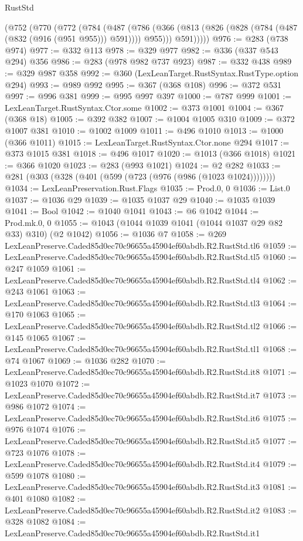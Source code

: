 \begin{lexlean}{RustStd}
\begin{coremodule}
    (@752
      (@770
        (@772
          (@784
            (@487
              (@786 (@366 (@813 (@826 (@828 (@784 (@487 (@832 (@916 (@951 @955))) @591)))) @955)))
              @591)))))
@976 := @283 (@738 @974)
@977 := @332 @113
@978 := @329 @977
@982 := @336 (@337 @543 @294) @356
@986 := @283 (@978 @982 @737 @923)
@987 := @332 @438
@989 := @329 @987 @358
@992 := @360 (LexLeanTarget.RustSyntax.RustType.option @294)
@993 := @989 @992
@995 := @367 (@368 @108)
@996 := @372 @531
@997 := @996 @381
@999 := @995 @997 @397
@1000 := @787 @999
@1001 := LexLeanTarget.RustSyntax.Ctor.some
@1002 := @373 @1001
@1004 := @367 (@368 @18)
@1005 := @392 @382
@1007 := @1004 @1005 @310
@1009 := @372 @1007 @381
@1010 := @1002 @1009
@1011 := @496 @1010
@1013 := @1000 (@366 @1011)
@1015 := LexLeanTarget.RustSyntax.Ctor.none @294
@1017 := @373 @1015 @381
@1018 := @496 @1017
@1020 := @1013 (@366 @1018)
@1021 := @366 @1020
@1023 := @283 (@993 @1021)
@1024 := @2 @282
@1033 := @281 (@303 (@328 (@401 (@599 (@723 (@976 (@986 (@1023 @1024))))))))
@1034 := LexLeanPreservation.Rust.Flags
@1035 := Prod.{0, 0}
@1036 := List.{0}
@1037 := @1036 @29
@1039 := @1035 @1037 @29
@1040 := @1035 @1039
@1041 := Bool
@1042 := @1040 @1041
@1043 := @6 @1042
@1044 := Prod.mk.{0, 0}
@1055 := @1043 (@1044 @1039 @1041 (@1044 @1037 @29 @82 @33) @310) (@2 @1042)
@1056 := @1036 @7
@1058 := @269 LexLeanPreserve.Caded85d0ec70c96655a45904ef60abdb.R2.RustStd.tl6
@1059 := LexLeanPreserve.Caded85d0ec70c96655a45904ef60abdb.R2.RustStd.tl5
@1060 := @247 @1059
@1061 := LexLeanPreserve.Caded85d0ec70c96655a45904ef60abdb.R2.RustStd.tl4
@1062 := @243 @1061
@1063 := LexLeanPreserve.Caded85d0ec70c96655a45904ef60abdb.R2.RustStd.tl3
@1064 := @170 @1063
@1065 := LexLeanPreserve.Caded85d0ec70c96655a45904ef60abdb.R2.RustStd.tl2
@1066 := @145 @1065
@1067 := LexLeanPreserve.Caded85d0ec70c96655a45904ef60abdb.R2.RustStd.tl1
@1068 := @74 @1067
@1069 := @1036 @282
@1070 := LexLeanPreserve.Caded85d0ec70c96655a45904ef60abdb.R2.RustStd.it8
@1071 := @1023 @1070
@1072 := LexLeanPreserve.Caded85d0ec70c96655a45904ef60abdb.R2.RustStd.it7
@1073 := @986 @1072
@1074 := LexLeanPreserve.Caded85d0ec70c96655a45904ef60abdb.R2.RustStd.it6
@1075 := @976 @1074
@1076 := LexLeanPreserve.Caded85d0ec70c96655a45904ef60abdb.R2.RustStd.it5
@1077 := @723 @1076
@1078 := LexLeanPreserve.Caded85d0ec70c96655a45904ef60abdb.R2.RustStd.it4
@1079 := @599 @1078
@1080 := LexLeanPreserve.Caded85d0ec70c96655a45904ef60abdb.R2.RustStd.it3
@1081 := @401 @1080
@1082 := LexLeanPreserve.Caded85d0ec70c96655a45904ef60abdb.R2.RustStd.it2
@1083 := @328 @1082
@1084 := LexLeanPreserve.Caded85d0ec70c96655a45904ef60abdb.R2.RustStd.it1

\end{coremodule}
\end{lexlean}
